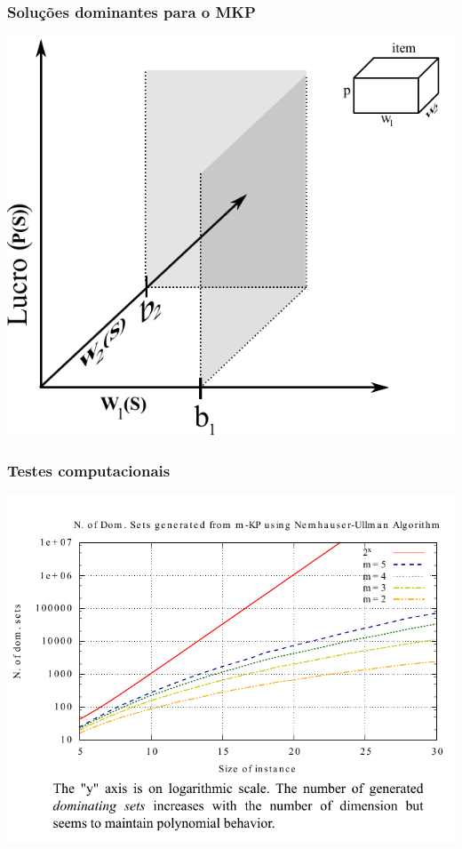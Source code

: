\documentclass[10pt,fleqn]{beamer}
\begin{document}
\begin{frame}
  \frametitle{Soluções dominantes para o MKP}
	\begin{center}
      \includegraphics[scale=0.7]{figs/axis-2dim}
	\end{center}
\end{frame}


\begin{frame}
  \frametitle{Testes computacionais}
	\begin{center}
      \includegraphics[scale=0.75]{graficos/results}
	\end{center}
\end{frame}
\end{document}
